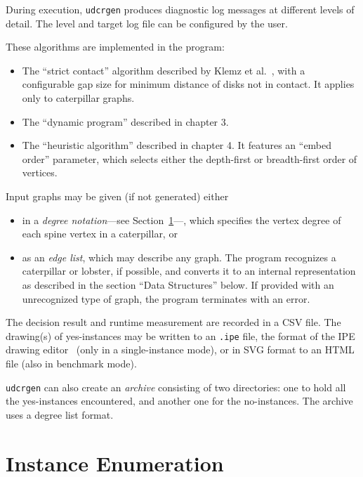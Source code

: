 During execution, \texttt{udcrgen} produces diagnostic log messages at different levels of detail. The level and target log file can be configured by the user.

These algorithms are implemented in the program:

\begin{itemize}
    \item The ``strict contact'' algorithm described by Klemz et al.~\cite{Klemz2015}, with a configurable gap size for minimum distance of disks not in contact. It applies only to caterpillar graphs.
    \item The ``dynamic program'' described in chapter 3.
    \item The ``heuristic algorithm'' described in chapter 4. It features an ``embed order'' parameter, which selects either the depth-first or breadth-first order of vertices.
\end{itemize}

Input graphs may be given (if not generated) either

\begin{itemize}
    \item in a \emph{degree notation}---see Section~\ref{section:ch6-enumeration}---, which specifies the vertex degree of each spine vertex in a caterpillar, or
    \item as an \emph{edge list}, which may describe any graph. The program recognizes a caterpillar or lobster, if possible, and converts it to an internal representation as described in the section ``Data Structures'' below. If provided with an unrecognized type of graph, the program terminates with an error.
\end{itemize}

The decision result and runtime measurement are recorded in a CSV file. The drawing(s) of yes-instances may be written to an \texttt{.ipe} file, the format of the IPE drawing editor~\cite{cheong_ipe_2022} (only in a single-instance mode), or in SVG format to an HTML file (also in benchmark mode).

\texttt{udcrgen} can also create an \emph{archive} consisting of two directories: one to hold all the yes-instances encountered, and another one for the no-instances. The archive uses a degree list format.

\section{Instance Enumeration}
\label{section:ch6-enumeration}

